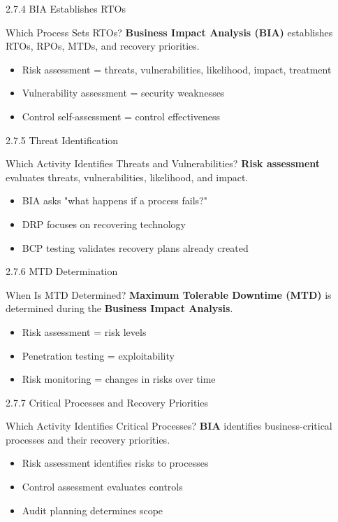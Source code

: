 \documentclass{beamer}
\begin{document}
	\begin{frame}{2.7.4 BIA Establishes RTOs}
		\begin{block}{Which Process Sets RTOs?}
			\textbf{Business Impact Analysis (BIA)} establishes RTOs, RPOs, MTDs, and recovery priorities.
		\end{block}
		\begin{itemize}
			\item Risk assessment = threats, vulnerabilities, likelihood, impact, treatment
			\item Vulnerability assessment = security weaknesses
			\item Control self-assessment = control effectiveness
		\end{itemize}
	\end{frame}
	
	\begin{frame}{2.7.5 Threat Identification}
		\begin{block}{Which Activity Identifies Threats and Vulnerabilities?}
			\textbf{Risk assessment} evaluates threats, vulnerabilities, likelihood, and impact.
		\end{block}
		\begin{itemize}
			\item BIA asks "what happens if a process fails?"
			\item DRP focuses on recovering technology
			\item BCP testing validates recovery plans already created
		\end{itemize}
	\end{frame}
	
	\begin{frame}{2.7.6 MTD Determination}
		\begin{block}{When Is MTD Determined?}
			\textbf{Maximum Tolerable Downtime (MTD)} is determined during the \textbf{Business Impact Analysis}.
		\end{block}
		\begin{itemize}
			\item Risk assessment = risk levels
			\item Penetration testing = exploitability
			\item Risk monitoring = changes in risks over time
		\end{itemize}
	\end{frame}
	
	\begin{frame}{2.7.7 Critical Processes and Recovery Priorities}
		\begin{block}{Which Activity Identifies Critical Processes?}
			\textbf{BIA} identifies business-critical processes and their recovery priorities.
		\end{block}
		\begin{itemize}
			\item Risk assessment identifies risks to processes
			\item Control assessment evaluates controls
			\item Audit planning determines scope
		\end{itemize}
	\end{frame}
	
\end{document}
